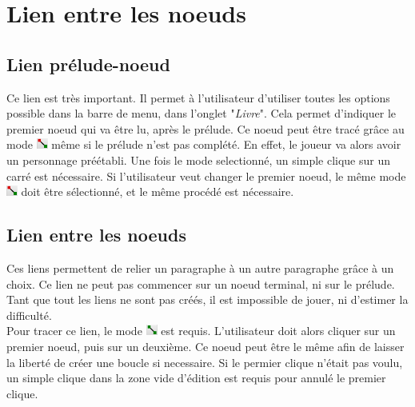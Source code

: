 \chapter{Lien entre les noeuds}\label{chapter:lien}

	\section{Lien prélude-noeud}
		Ce lien est très important. Il permet à l'utilisateur d'utiliser toutes les options possible dans la barre de menu, dans l'onglet "\textit{Livre}". Cela permet d'indiquer le premier noeud qui va être lu, après le prélude. Ce noeud peut être tracé grâce au mode \includegraphics[height=10pt]{img/modePreludeNoeud.png} même si le prélude n'est pas complété. En effet, le joueur va alors avoir un personnage préétabli.
		Une fois le mode selectionné, un simple clique sur un carré est nécessaire. Si l'utilisateur veut changer le premier noeud, le même mode \includegraphics[height=10pt]{img/modePreludeNoeud.png} doit être sélectionné, et le même procédé est nécessaire.

	\section{Lien entre les noeuds}
		Ces liens permettent de relier un paragraphe à un autre paragraphe grâce à un choix. Ce lien ne peut pas commencer sur un noeud terminal, ni sur le prélude. Tant que tout les liens ne sont pas créés, il est impossible de jouer, ni d'estimer la difficulté.\\

		Pour tracer ce lien, le mode \includegraphics[height=10pt]{img/modeLien.png} est requis. L'utilisateur doit alors cliquer sur un premier noeud, puis sur un deuxième. Ce noeud peut être le même afin de laisser la liberté de créer une boucle si necessaire.
		Si le permier clique n'était pas voulu, un simple clique dans la zone vide d'édition est requis pour annulé le premier clique.\\

